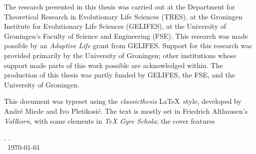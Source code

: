 \thispagestyle{empty}

\hfill

\vfill


\noindent The research presented in this thesis was carried out at the Department for Theoretical Research in Evolutionary Life Sciences (TRES), at the Groningen Institute for Evolutionary Life Sciences (GELIFES), at the University of Groningen's Faculty of Science and Engineering (FSE).
This research was made possible by an \emph{Adaptive Life} grant from GELIFES.
Support for this research was provided primarily by the University of Groningen; other institutions whose support made parts of this work possible are acknowledged within.
The production of this thesis was partly funded by GELIFES, the FSE, and the University of Groningen.

\medskip

\noindent This document was typeset using the \emph{classicthesis} \LaTeX~style, developed by Andr\'e Miede and Ivo Pletikosić.
The text is mostly set in Friedrich Althausen's \emph{Vollkorn}, with some elements in \emph{TeX Gyre Schola}; the cover features 

\bigskip

\noindent\finalVersionString

\noindent\myName. \textit{\myTitle.}%
\\
\noindent \textcopyright\ \today
